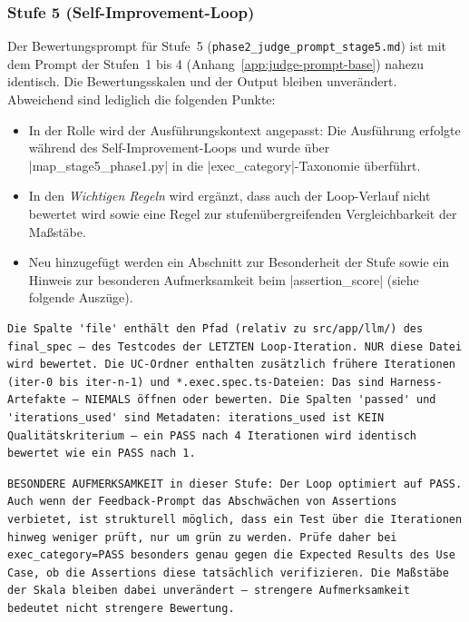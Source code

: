 \begingroup
{}
\label{lst:judge-prompt}
\endgroup
\nopagebreak
\inputminted{markdown}{Quellcode/phase2_judge_prompt.md}

\subsubsection{Stufe 5 (Self-Improvement-Loop)}
\label{app:judge-prompt-stage5}

Der Bewertungsprompt für Stufe~5 (\texttt{phase2\_judge\_prompt\_stage5.md}) ist mit dem Prompt der Stufen~1 bis 4 (Anhang~\ref{app:judge-prompt-base}) nahezu identisch. Die Bewertungsskalen und der Output bleiben unverändert. Abweichend sind lediglich die folgenden Punkte:

\begin{itemize}
	\item In der Rolle wird der Ausführungskontext angepasst: Die Ausführung erfolgte während des Self-Improvement-Loops und wurde über \code|map_stage5_phase1.py| in die \code|exec_category|-Taxonomie überführt.
	\item In den \emph{Wichtigen Regeln} wird ergänzt, dass auch der Loop-Verlauf nicht bewertet wird sowie eine Regel zur stufenübergreifenden Vergleichbarkeit der Maßstäbe.
	\item Neu hinzugefügt werden ein Abschnitt zur Besonderheit der Stufe sowie ein Hinweis zur besonderen Aufmerksamkeit beim \code|assertion_score| (siehe folgende Auszüge).
\end{itemize}

\begin{listing}[H]
\caption{Neuer Abschnitt \enquote{Besonderheit dieser Stufe}}
\label{lst:stage5-besonderheit}
\begin{verbatim}
Die Spalte 'file' enthält den Pfad (relativ zu src/app/llm/) des final_spec — des Testcodes der LETZTEN Loop-Iteration. NUR diese Datei wird bewertet. Die UC-Ordner enthalten zusätzlich frühere Iterationen (iter-0 bis iter-n-1) und *.exec.spec.ts-Dateien: Das sind Harness-Artefakte — NIEMALS öffnen oder bewerten. Die Spalten 'passed' und 'iterations_used' sind Metadaten: iterations_used ist KEIN Qualitätskriterium — ein PASS nach 4 Iterationen wird identisch bewertet wie ein PASS nach 1.
\end{verbatim}
\end{listing}

\begin{listing}[H]
\caption{Zusatz beim assertion\_score}
\label{lst:stage5-assertion}
\begin{verbatim}
BESONDERE AUFMERKSAMKEIT in dieser Stufe: Der Loop optimiert auf PASS. Auch wenn der Feedback-Prompt das Abschwächen von Assertions verbietet, ist strukturell möglich, dass ein Test über die Iterationen hinweg weniger prüft, nur um grün zu werden. Prüfe daher bei exec_category=PASS besonders genau gegen die Expected Results des Use Case, ob die Assertions diese tatsächlich verifizieren. Die Maßstäbe der Skala bleiben dabei unverändert — strengere Aufmerksamkeit bedeutet nicht strengere Bewertung.
\end{verbatim}
\end{listing}

